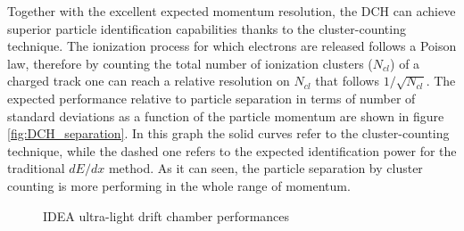 Together with the excellent expected momentum resolution, the DCH can achieve superior particle identification capabilities thanks to the cluster-counting technique. The ionization process for which electrons are released follows a Poison law, therefore by counting the total number of ionization clusters ($N_{cl}$) of a charged track one can reach a relative resolution on $N_{cl}$ that follows $1/\sqrt{N_{cl}}$. The expected performance relative to particle separation in terms of number of standard deviations as a function of the particle momentum are shown in figure \ref{fig:DCH_separation}. In this graph the solid curves refer to the cluster-counting technique, while the dashed one refers to the expected identification power for the traditional $dE/dx$ method. As it can seen, the particle separation by cluster counting is more performing in the whole range of momentum.

\begin{figure}
	\centering
	 \quad
	\caption{IDEA ultra-light drift chamber performances \cite{FCC-ee_design}}
\end{figure}

